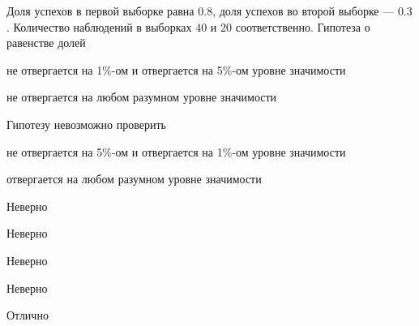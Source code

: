 
\begin{question}
Доля успехов в первой выборке равна \(0.8\), доля успехов во второй
выборке --- \(0.3\). Количество наблюдений в выборках \(40\) и \(20\)
соответственно. Гипотеза о равенстве долей
\begin{answerlist}
  \item не отвергается на 1\%-ом и отвергается на 5\%-ом уровне значимости
  \item не отвергается на любом разумном уровне значимости
  \item Гипотезу невозможно проверить
  \item не отвергается на 5\%-ом и отвергается на 1\%-ом уровне значимости
  \item отвергается на любом разумном уровне значимости
\end{answerlist}
\end{question}

\begin{solution}
\begin{answerlist}
  \item Неверно
  \item Неверно
  \item Неверно
  \item Неверно
  \item Отлично
\end{answerlist}
\end{solution}

